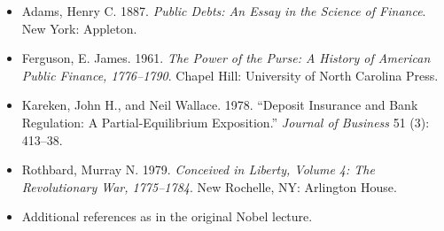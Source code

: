 \documentclass[12pt]{article}
\begin{document}
\begin{small}
\begin{itemize}
\item Adams, Henry C. 1887. \textit{Public Debts: An Essay in the Science of Finance}. New York: Appleton.

\item Ferguson, E. James. 1961. \textit{The Power of the Purse: A History of American Public Finance, 1776--1790}. Chapel Hill: University of North Carolina Press.

\item Kareken, John H., and Neil Wallace. 1978. ``Deposit Insurance and Bank Regulation: A Partial-Equilibrium Exposition.'' \textit{Journal of Business} 51 (3): 413--38.

\item Rothbard, Murray N. 1979. \textit{Conceived in Liberty, Volume 4: The Revolutionary War, 1775--1784}. New Rochelle, NY: Arlington House.

\item Additional references as in the original Nobel lecture.
\end{itemize}
\end{small}
\end{document}
